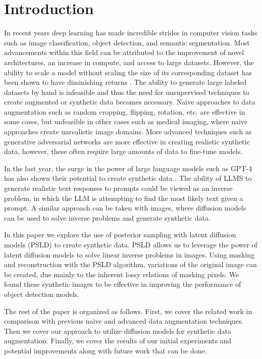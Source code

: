\documentclass{article}
\begin{document}
\section{Introduction}
\label{introdcution}

In recent years deep learning has made incredible strides in computer vision tasks such as image classification,
object detection, and semantic segmentation. Most advancements within this field can be attributed to the improvement
of novel architectures, an increase in compute, and access to large datasets. However, the ability to scale a model
without scaling the size of its corresponding dataset has been shown to have diminishing returns \cite{2001.08361}.
The ability to generate large labeled datasets by hand is infeasible and thus the need for unsupervised techniques to create
augmented or synthetic data becomes necessary. Naive approaches to data augmentation such as random cropping, flipping,
rotation, etc. are effective in some cases, but unfeasible in other cases such as medical imaging, where
naive approaches create unrealistic image domains. More advanced techniques such as generative adversarial networks
\cite{1406.2661} are more effective in creating realistic synthetic data, however, these often require large amounts of data
to fine-tune models.

In the last year, the surge in the power of large language models such as GPT-4 has also shown their potential to create synthetic
data \cite{2304.13861}. The ability of LLMS to generate realistic text responses to prompts could be viewed as an inverse problem, in which the 
LLM is attempting to find the most likely text given a prompt. A similar approach can be taken with images, where diffusion models can be used to solve
inverse problems and generate synthetic data.

In this paper we explore the use of posterior sampling with latent diffusion models (PSLD) \cite{rout2023solving} to create synthetic data. PSLD
allows us to leverage the power of latent diffusion models to solve linear inverse problems in images. Using masking and reconstruction with
the PSLD algorithm, variations of the original image can be created, due mainly to the inherent lossy relations of masking pixels. 
We found these synthetic images to be effective in improving the performance of object detection models.

The rest of the paper is organized as follows. First, we cover the related work in comparison with previous naive and advanced data
augmentation techniques. Then we cover our approach to utilize diffusion models for synthetic data augmentation.
Finally, we cover the results of our initial experiments and potential improvements along with future work that can be done.
 
\end{document}
